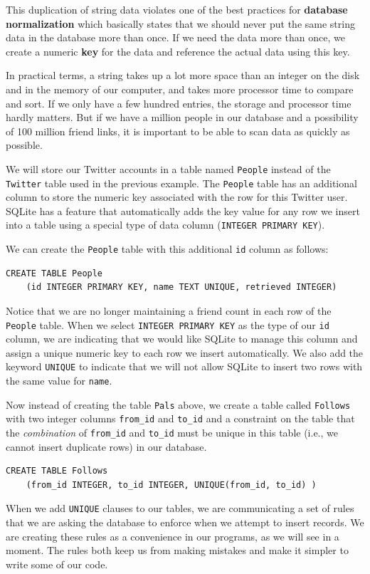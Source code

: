 This duplication of string data violates one of the best practices 
for {\bf database normalization} which basically states that
we should never put the same string data in the database more than once.  
If we need the data more than once, we create a 
numeric {\bf key} for the data and reference the actual data 
using this key.

In practical terms, a string takes up a lot more 
space than an integer on the disk
and in the memory of our computer, and takes more processor time
to compare and sort.  If we only have a few hundred entries, 
the storage and processor time hardly matters.  But if we have 
a million people in our database and a possibility of 100 million
friend links, it is important to be able to scan data as quickly
as possible.

We will store our Twitter accounts in a table named {\tt People}
instead of the {\tt Twitter} table used in the previous example.
The {\tt People} table has an additional column 
to store the numeric key associated with the 
row for this Twitter user.   
SQLite has a feature that automatically adds the key value
for any row we insert into a table using a special type of 
data column ({\tt INTEGER PRIMARY KEY}).

We can create the {\tt People} table with this additional 
{\tt id} column as follows:

\beforeverb
\begin{verbatim}
CREATE TABLE People 
    (id INTEGER PRIMARY KEY, name TEXT UNIQUE, retrieved INTEGER)
\end{verbatim}
\afterverb
%
Notice that we are no longer maintaining a friend count in each row
of the {\tt People} table.
When we select {\tt INTEGER PRIMARY KEY} as the type of our {\tt id} column,
we are indicating that we would like SQLite to manage this column and 
assign a unique numeric key to each row we insert automatically.
We also add the keyword {\tt UNIQUE} to indicate that we will not 
allow SQLite to insert two rows with the same value for {\tt name}.

Now instead of creating the table {\tt Pals} above, we create
a table called {\tt Follows} with two integer columns
\verb"from_id" and \verb"to_id" and a constraint on the table that
the \emph{combination} of \verb"from_id" and \verb"to_id" must be unique 
in this table (i.e., we cannot insert duplicate rows) in our database.

\beforeverb
\begin{verbatim}
CREATE TABLE Follows 
    (from_id INTEGER, to_id INTEGER, UNIQUE(from_id, to_id) )
\end{verbatim}
\afterverb
%
When we add {\tt UNIQUE} clauses to our tables, we are communicating a set
of rules that we are asking the database to enforce when we attempt to insert
records.   We are creating these rules as a convenience in our programs, as we
will see in a moment.  The rules both keep us from making mistakes and make
it simpler to write some of our code.

